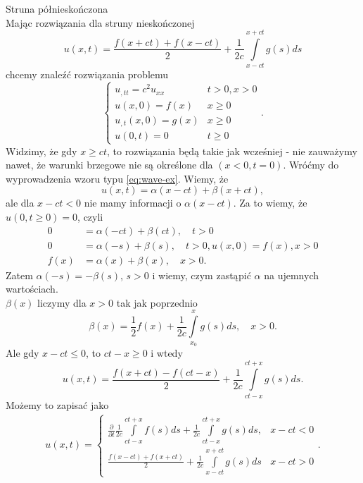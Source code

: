 \documentclass[../main.tex]{subfiles}
\begin{document}
\begin{przyklad}
		Struna półnieskończona\\
		Mając rozwiązania dla struny nieskończonej
		\begin{equation}
				\label{eq:wave-ex}
				u(x,t) = \frac{f(x+ct) + f(x-ct)}{2} + \frac{1}{2c} \int\limits_{x-ct}^{x+ct}g(s)d s
		\end{equation}
		chcemy znaleźć rozwiązania problemu
\[
\begin{cases}
		u_{,t t} = c^2 u_{x x}&t>0,x>0\\
		u(x,0) = f(x) & x\ge 0\\
		u_{,t}(x,0) = g(x) & x\ge 0\\
		u(0,t) = 0& t \ge 0
\end{cases}
.\]
Widzimy, że gdy $x\ge ct$, to rozwiązania będą takie jak wcześniej - nie zauważymy nawet, że warunki brzegowe nie są określone dla $(x<0,t=0)$. Wróćmy do wyprowadzenia wzoru typu \ref{eq:wave-ex}. Wiemy, że
\[
		u(x,t) = \alpha(x-ct) + \beta(x+ct)
,\]
ale dla $x-ct < 0$ nie mamy informacji o $\alpha(x-ct)$. Za to wiemy, że $u(0,t\ge0) = 0$, czyli
\begin{align*}
		0 &= \alpha(-ct) + \beta(ct),\quad t>0\\
		0 &= \alpha(-s) + \beta(s),\quad t>0,u(x,0) = f(x),x>0\\
		f(x) &= \alpha(x) + \beta(x),\quad x>0
.\end{align*}
		Zatem $\alpha(-s) = -\beta(s)$, $s>0$ i wiemy, czym zastąpić $\alpha$ na ujemnych wartościach.\\
		$\beta(x)$ liczymy dla $x>0 $ tak jak poprzednio
		\[
				\beta(x) = \frac{1}{2}f(x) + \frac{1}{2c}\int\limits_{x_0}^{x}g(s)d s,\quad x > 0
		.\]
		Ale gdy $x - ct \le 0$, to $ct - x \ge 0$ i wtedy
		\[
				u(x,t) = \frac{f(x+ct) - f(ct-x)}{2} + \frac{1}{2c}\int\limits_{ct-x}^{ct+x}g(s)d s
		.\]
		Możemy to zapisać jako
		\begin{align*}
				u(x,t) = \begin{cases}
						\frac{\partial }{\partial t} \frac{1}{2c}\int\limits_{ct-x}^{ct+x}f(s) d s + \frac{1}{2c}\int\limits_{ct-x}^{ct+x}g(s)d s,&x - ct < 0\\
						\frac{f(x-ct) + f(x+ct)}{2} + \frac{1}{2c}\int\limits_{x-ct}^{x+ct}g(s) d s & x-ct > 0
\end{cases}
		.\end{align*}
\end{przyklad}
\end{document}
